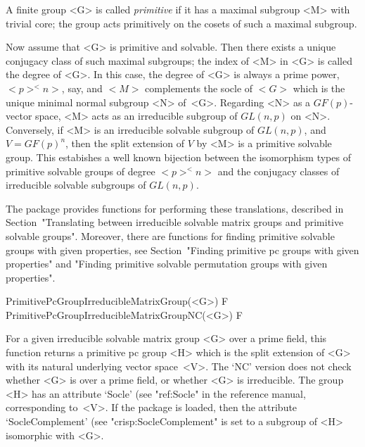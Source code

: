 


A finite group <G> is called {\it primitive} if it has a maximal subgroup <M> with 
trivial core; the group acts primitively on the cosets of such
a maximal subgroup.  

Now assume that <G> is primitive and solvable. Then there exists a unique conjugacy class of 
such maximal subgroups; the index of <M> in <G> is called the degree of <G>.
In this case, the degree of <G> is always a prime power, $<p>^<n>$, say, and $<M>$ 
complements the socle of $<G>$ which is the unique minimal normal subgroup <N> of~<G>. 
Regarding <N> as a $GF(p)$-vector space, <M> acts as an irreducible subgroup of $GL(n,p)$ on <N>.
Conversely, if <M> is an irreducible solvable subgroup of $GL(n,p)$, and $V = GF(p)^n$, then the
split extension of $V$ by <M> is a primitive solvable group. 
This estabishes a well known
bijection between the isomorphism types of primitive solvable groups of degree
$<p>^<n>$ and the conjugacy classes of irreducible solvable subgroups of $GL(n, p)$.

The {\IRREDSOL} package provides functions for performing these translations,
described in Section~"Translating between irreducible solvable matrix groups 
and primitive solvable groups". Moreover, there are functions for finding
primitive solvable groups with given properties, see Section~"Finding primitive pc groups
with given properties" and "Finding primitive solvable permutation groups
with given properties".




\>PrimitivePcGroupIrreducibleMatrixGroup(<G>) F
\>PrimitivePcGroupIrreducibleMatrixGroupNC(<G>) F

For a given irreducible solvable matrix group <G> over a prime field, this function
returns a primitive pc group <H> which is the split extension of <G> with its natural
underlying vector space~<V>. The `NC' version does not check whether <G> is over a prime field, 
or whether <G> is irreducible. The group <H> has an attribute `Socle' (see "ref:Socle" 
in the {\GAP} reference manual, corresponding to~<V>. If the package {\CRISP} is loaded, 
then the attribute `SocleComplement' (see "crisp:SocleComplement" is set to a subgroup of 
<H> isomorphic with <G>.

